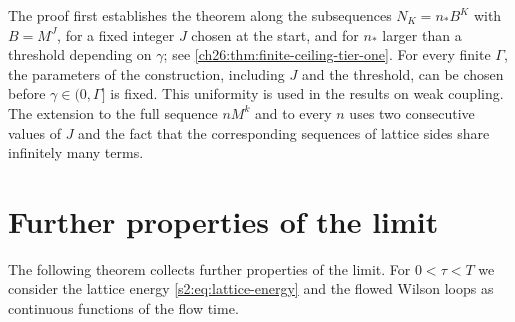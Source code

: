 \begin{remark}\label{s2:rem:ladders}
The proof first establishes the theorem along the subsequences $N_K=n_*B^K$ with $B=M^J$, for a fixed integer $J$ chosen at the start, and for $n_*$ larger than a threshold depending on $\gamma$; see \cref{ch26:thm:finite-ceiling-tier-one}. For every finite $\Gamma$, the parameters of the construction, including $J$ and the threshold, can be chosen before $\gamma\in(0,\Gamma]$ is fixed. This uniformity is used in the results on weak coupling. The extension to the full sequence $nM^k$ and to every $n$ uses two consecutive values of $J$ and the fact that the corresponding sequences of lattice sides share infinitely many terms.
\end{remark}

\section{Further properties of the limit}\label{s2:further}

The following theorem collects further properties of the limit. For $0<\tau<T$ we consider the lattice energy \eqref{s2:eq:lattice-energy} and the flowed Wilson loops as continuous functions of the flow time.

